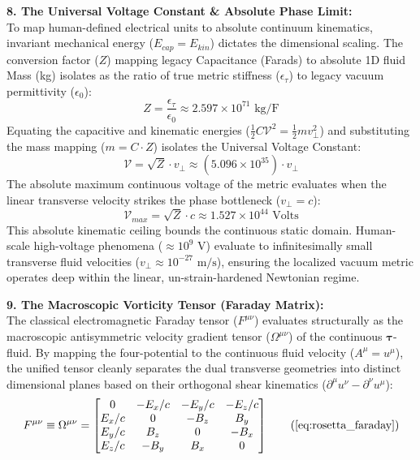 \documentclass[11pt, a4paper]{article}
\begin{document}
\textbf{8. The Universal Voltage Constant \& Absolute Phase Limit:} \\
To map human-defined electrical units to absolute continuum kinematics, invariant mechanical energy ($E_{cap} = E_{kin}$) dictates the dimensional scaling. The conversion factor ($Z$) mapping legacy Capacitance (Farads) to absolute 1D fluid Mass (kg) isolates as the ratio of true metric stiffness ($\epsilon_{\tau}$) to legacy vacuum permittivity ($\epsilon_0$):
\begin{equation}
    Z = \frac{\epsilon_{\tau}}{\epsilon_0} \approx 2.597 \times 10^{71} \text{ kg/F}
\end{equation}
Equating the capacitive and kinematic energies ($\frac{1}{2} C \mathcal{V}^2 = \frac{1}{2} m v_{\perp}^2$) and substituting the mass mapping ($m = C \cdot Z$) isolates the Universal Voltage Constant:
\begin{equation}
    \mathcal{V} = \sqrt{Z} \cdot v_{\perp} \approx (5.096 \times 10^{35}) \cdot v_{\perp} \label{eq:universal_voltage_a}
\end{equation}
The absolute maximum continuous voltage of the metric evaluates when the linear transverse velocity strikes the phase bottleneck ($v_{\perp} = c$):
\begin{equation}
    \mathcal{V}_{max} = \sqrt{Z} \cdot c \approx 1.527 \times 10^{44} \text{ Volts} \label{eq:universal_voltage_b}
\end{equation}
This absolute kinematic ceiling bounds the continuous static domain. Human-scale high-voltage phenomena ($\approx 10^9 \text{ V}$) evaluate to infinitesimally small transverse fluid velocities ($v_{\perp} \approx 10^{-27} \text{ m/s}$), ensuring the localized vacuum metric operates deep within the linear, un-strain-hardened Newtonian regime.

\textbf{9. The Macroscopic Vorticity Tensor (Faraday Matrix):} \\
The classical electromagnetic Faraday tensor ($F^{\mu\nu}$) evaluates structurally as the macroscopic antisymmetric velocity gradient tensor ($\Omega^{\mu\nu}$) of the continuous $\boldsymbol{\tau}$-fluid. By mapping the four-potential to the continuous fluid velocity ($A^\mu = u^\mu$), the unified tensor cleanly separates the dual transverse geometries into distinct dimensional planes based on their orthogonal shear kinematics ($\partial^\mu u^\nu - \partial^\nu u^\mu$):
\begin{equation}
    F^{\mu\nu} \equiv \Omega^{\mu\nu} = \begin{bmatrix} 
    0 & -E_x/c & -E_y/c & -E_z/c \\ 
    E_x/c & 0 & -B_z & B_y \\ 
    E_y/c & B_z & 0 & -B_x \\ 
    E_z/c & -B_y & B_x & 0 
    \end{bmatrix} \tag{\ref{eq:rosetta_faraday}}
\end{equation}
\end{document}
